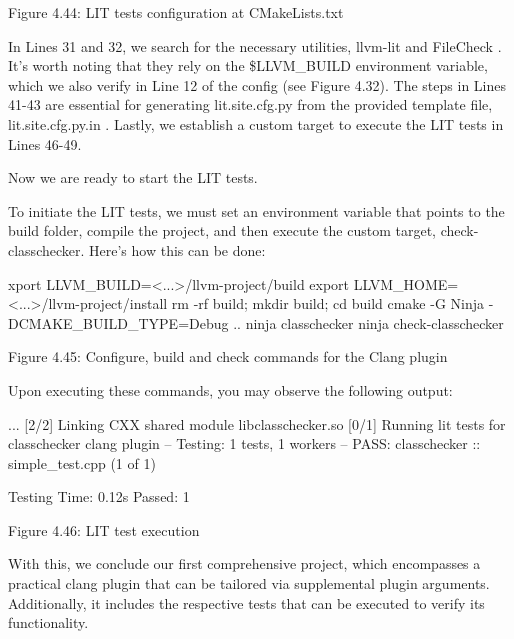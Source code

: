 \begin{center}
Figure 4.44: LIT tests configuration at CMakeLists.txt
\end{center}

In Lines 31 and 32, we search for the necessary utilities, llvm-lit and FileCheck . It's worth noting that they rely on the \$LLVM\_BUILD environment variable, which we also verify in Line 12 of the config (see Figure 4.32). The steps in Lines 41-43 are essential for generating lit.site.cfg.py from the provided template file, lit.site.cfg.py.in . Lastly, we establish a custom target to execute the LIT tests in Lines 46-49.

Now we are ready to start the LIT tests.


To initiate the LIT tests, we must set an environment variable that points to the build folder, compile the project, and then execute the custom target, check-classchecker. Here's how this can be done:

\begin{shell}
xport LLVM_BUILD=<...>/llvm-project/build
export LLVM_HOME=<...>/llvm-project/install
rm -rf build; mkdir build; cd build
cmake -G Ninja -DCMAKE_BUILD_TYPE=Debug ..
ninja classchecker
ninja check-classchecker
\end{shell}

\begin{center}
Figure 4.45: Configure, build and check commands for the Clang plugin
\end{center}

Upon executing these commands, you may observe the following output:

\begin{shell}
...
[2/2] Linking CXX shared module libclasschecker.so
[0/1] Running lit tests for classchecker clang plugin
-- Testing: 1 tests, 1 workers --
PASS: classchecker :: simple_test.cpp (1 of 1)

Testing Time: 0.12s
Passed: 1
\end{shell}

\begin{center}
Figure 4.46: LIT test execution
\end{center}

With this, we conclude our first comprehensive project, which encompasses a practical clang plugin that can be tailored via supplemental plugin arguments. Additionally, it includes the respective tests that can be executed to verify its functionality.








